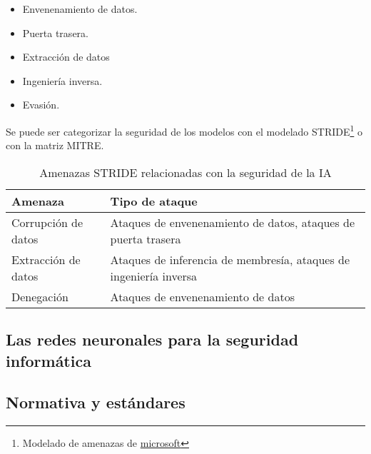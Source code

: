 \begin{itemize}
    \item Envenenamiento de datos.
    \item Puerta trasera.
    \item Extracción de datos
    \item Ingeniería inversa.
    \item Evasión.
\end{itemize}

Se puede ser categorizar la seguridad de los modelos con el modelado \gls{STRIDE}\footnote{Modelado de amenazas de \href{https://learn.microsoft.com/es-es/azure/security/develop/threat-modeling-tool-threats}{microsoft}} o con la matriz \gls{MITRE}.

\begin{table}[H]
    \centering
    \small
    \begin{tabularx}{\textwidth}{|l|X|}
        \hline
        \textbf{Amenaza}    & \textbf{Tipo de ataque}                                           \\
        \hline
        Corrupción de datos & Ataques de envenenamiento de datos, ataques de puerta trasera     \\
        Extracción de datos & Ataques de inferencia de membresía, ataques de ingeniería inversa \\
        Denegación          & Ataques de envenenamiento de datos                                \\
        \hline
    \end{tabularx}
    \caption{Amenazas STRIDE relacionadas con la seguridad de la IA}
    \label{tab:amenazas}
\end{table}


\subsection{Las redes neuronales para la seguridad informática}





\subsection{Normativa y estándares}

